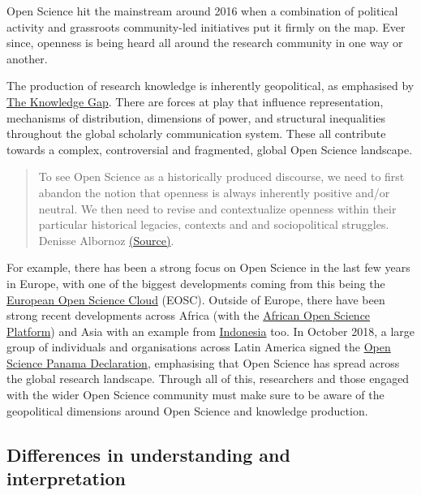\documentclass[]{book}
\begin{document}
Open Science hit the mainstream around 2016 when a combination of political activity and grassroots community-led initiatives put it firmly on the map. Ever since, openness is being heard all around the research community in one way or another.

The production of research knowledge is inherently geopolitical, as emphasised by \href{http://knowledgegap.org/}{The Knowledge Gap}. There are forces at play that influence representation, mechanisms of distribution, dimensions of power, and structural inequalities throughout the global scholarly communication system. These all contribute towards a complex, controversial and fragmented, global Open Science landscape.

\begin{quote}
To see Open Science as a historically produced discourse, we need to first abandon the notion that openness is always inherently positive and/or neutral. We then need to revise and contextualize openness within their particular historical legacies, contexts and and sociopolitical struggles. Denisse Albornoz \href{https://medium.com/@denalbz/power-and-inequality-in-open-science-discourses-9d425b0c2b63}{(Source)}.
\end{quote}

For example, there has been a strong focus on Open Science in the last few years in Europe, with one of the biggest developments coming from this being the \href{http://ec.europa.eu/research/openscience/index.cfm?pg=open-science-cloud}{European Open Science Cloud} (EOSC). Outside of Europe, there have been strong recent developments across Africa (with the \href{http://africanopenscience.org.za/}{African Open Science Platform}) and Asia with an example from \href{https://blogs.openaire.eu/?p=3105}{Indonesia} too. In October 2018, a large group of individuals and organisations across Latin America signed the \href{http://openaccessweek.org/profiles/blogs/open-scicence-panama-declaration-latin-america-going-beyond-open}{Open Science Panama Declaration}, emphasising that Open Science has spread across the global research landscape. Through all of this, researchers and those engaged with the wider Open Science community must make sure to be aware of the geopolitical dimensions around Open Science and knowledge production.

\hypertarget{differences-in-understanding-and-interpretation}{%
\subsection{Differences in understanding and interpretation }\label{differences-in-understanding-and-interpretation}}
\end{document}
